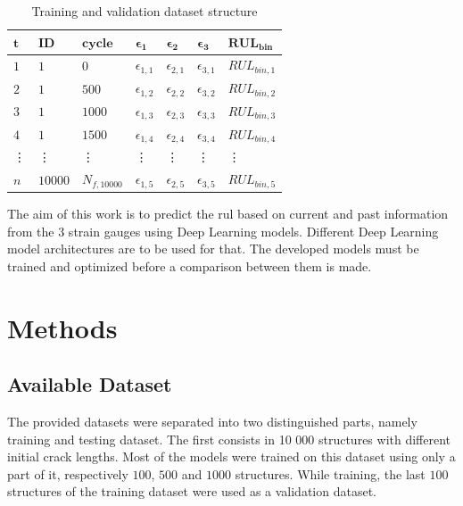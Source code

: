 \documentclass[conference]{IEEEtran}
\begin{document}
\begin{table}[htp]
	\centering
	\caption{Training and validation dataset structure}
	\label{tab:sliding_window_approach}
	\begin{tabular}{lllllll}
		$ \boldsymbol{t} $ & $ \boldsymbol{ID} $ & $ \boldsymbol{cycle} $ & $ \boldsymbol{\epsilon_1} $     & $ \boldsymbol{\epsilon_2} $     & $ \boldsymbol{\epsilon_3} $     & $ \boldsymbol{RUL_{bin}} $   \\
		\hline
		$ 1 $ & $ 1 $  & $ 0 $     & $ \epsilon_{1,1} $ & $ \epsilon_{2,1} $ &  $ \epsilon_{3,1} $ &  $ RUL_{bin,1} $ \\
		$ 2 $ & $ 1 $  & $ 500 $   & $ \epsilon_{1,2} $ & $ \epsilon_{2,2} $ & $ \epsilon_{3,2} $ & $ RUL_{bin,2} $ \\
		$ 3 $ & $ 1 $  & $ 1000 $  & $ \epsilon_{1,3} $ & $ \epsilon_{2,3} $ & $ \epsilon_{3,3} $ & $ RUL_{bin,3} $ \\
		$ 4 $ & $ 1 $  & $ 1500 $  & $ \epsilon_{1,4} $ & $ \epsilon_{2,4} $ & $ \epsilon_{3,4} $ & $ RUL_{bin,4} $ \\
		\vdots & \vdots & \vdots & \vdots & \vdots &\vdots & \vdots \\
		$ n $ & $ 10000 $  & $ N_{f,10000} $  & $ \epsilon_{1,5} $ & $ \epsilon_{2,5} $ & $ \epsilon_{3,5} $ & $ RUL_{bin,5} $
	\end{tabular}
\end{table}

The aim of this work is to predict the \gls{rul} based on current and past information from the 3 strain gauges using Deep Learning models. Different Deep Learning model architectures are to be used for that. The developed models must be trained and optimized before a comparison between them is made.

\section{Methods}
\label{sec:methods}

\noindent
\subsection{Available Dataset}

The provided datasets were separated into two distinguished parts, namely training and testing dataset. The first consists in 10 000 structures with different initial crack lengths. Most of the models were trained on this dataset using only a part of it, respectively $ 100 $, $ 500 $ and $ 1 000 $ structures. While training, the last $ 100 $ structures of the training dataset were used as a validation dataset.
\end{document}
